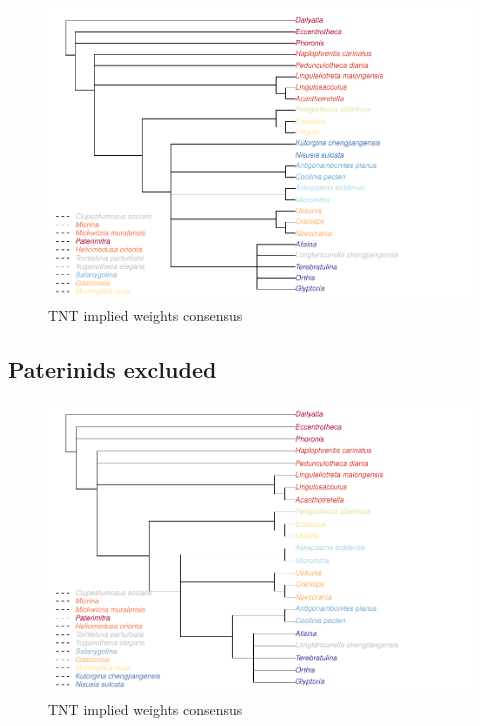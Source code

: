 \documentclass[]{book}
\theoremstyle{definition}
\theoremstyle{definition}
\theoremstyle{definition}
\theoremstyle{remark}
\begin{document}
\begin{figure}
\centering
\includegraphics{Brachiopod_phylogeny_files/figure-latex/unnamed-chunk-7-1.pdf}
\caption{\label{fig:unnamed-chunk-7}TNT implied weights consensus}
\end{figure}

\hypertarget{paterinids-excluded}{%
\subsection{Paterinids excluded}\label{paterinids-excluded}}

\begin{figure}
\centering
\includegraphics{Brachiopod_phylogeny_files/figure-latex/unnamed-chunk-8-1.pdf}
\caption{\label{fig:unnamed-chunk-8}TNT implied weights consensus}
\end{figure}
\end{document}
